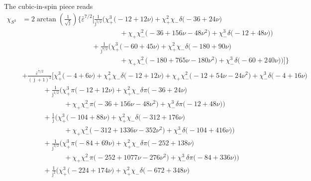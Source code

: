 \documentclass[prd,superscriptaddress,preprintnumbers,tightenlines,nofootinbib, eqsecnum]{revtex4-2}
\newcommand{\nn}{\nonumber}
\begin{document}
The cubic-in-spin piece reads
\begin{align}
\chi_{S^3} &= 2\arctan\!\left(\frac{1}{\sqrt{\bar{\jmath}}}\right)\Bigg\{\bar{\varepsilon}^{7/2}\Bigg[
\frac{1}{\bar{\jmath}^{5/2}}\Bigg(\chi_{+}^{3}\bigg(-12 + 12 \nu\bigg) + \chi_{+}^{2}\chi_{-}\delta\bigg(-36 + 24 \nu\bigg) \nn \\
&\qquad\qquad\qquad\qquad\qquad\qquad\qquad + \chi_{+}\chi_{-}^{2}\bigg(-36 + 156 \nu - 48 \nu^{2}\bigg) + \chi_{-}^{3}\delta\bigg(-12 + 48 \nu\bigg)\Bigg) \nn \\
&\qquad\qquad\qquad\qquad\qquad + \frac{1}{\bar{\jmath}^{7/2}}\Bigg(\chi_{+}^{3}\bigg(-60 + 45 \nu\bigg) + \chi_{+}^{2}\chi_{-}\delta\bigg(-180 + 90 \nu\bigg)\nn \\
&\qquad\qquad\qquad\qquad\qquad\qquad\qquad + \chi_{+}\chi_{-}^{2}\bigg(-180 + 765 \nu - 180 \nu^{2}\bigg)  + \chi_{-}^{3}\delta\bigg(-60 + 240 \nu\bigg)\Bigg)\Bigg]\Bigg\} \nn \\
&+ \frac{\bar{\varepsilon}^{7/2}}{(\bar{\jmath}+1)^{2}}\Bigg[
\chi_{+}^{3}\bigg(-4 + 6 \nu\bigg) + \chi_{+}^{2}\chi_{-}\delta\bigg(-12 + 12 \nu\bigg) + \chi_{+}\chi_{-}^{2}\bigg(-12 + 54 \nu - 24 \nu^{2}\bigg) + \chi_{-}^{3}\delta\bigg(-4 + 16 \nu\bigg) \nn \\
&\qquad\quad + \frac{1}{\bar{\jmath}^{1/2}}\Bigg(\chi_{+}^{3}\pi\bigg(-12 + 12 \nu\bigg) + \chi_{+}^{2}\chi_{-}\delta\pi\bigg(-36 + 24 \nu\bigg) \nn \\
&\qquad\qquad\qquad + \chi_{+}\chi_{-}^{2}\pi\bigg(-36 + 156 \nu - 48 \nu^{2}\bigg)  + \chi_{-}^{3}\delta\pi\bigg(-12 + 48 \nu\bigg)\Bigg) \nn \\
&\qquad\quad + \frac{1}{\bar{\jmath}}\Bigg(\chi_{+}^{3}\bigg(-104 + 88 \nu\bigg) + \chi_{+}^{2}\chi_{-}\delta\bigg(-312 + 176 \nu\bigg) \nn \\
&\qquad\qquad\qquad  + \chi_{+}\chi_{-}^{2}\bigg(-312 + 1336 \nu - 352 \nu^{2}\bigg)   + \chi_{-}^{3}\delta\bigg(-104 + 416 \nu\bigg)\Bigg) \nn \\
&\qquad\quad + \frac{1}{\bar{\jmath}^{3/2}}\Bigg(\chi_{+}^{3}\pi\bigg(-84 + 69 \nu\bigg) + \chi_{+}^{2}\chi_{-}\delta\pi\bigg(-252 + 138 \nu\bigg) \nn \\
&\qquad\qquad\qquad  + \chi_{+}\chi_{-}^{2}\pi\bigg(-252 + 1077 \nu - 276 \nu^{2}\bigg) + \chi_{-}^{3}\delta\pi\bigg(-84 + 336 \nu\bigg)\Bigg) \nn \\
&\qquad\quad + \frac{1}{\bar{\jmath}^{2}}\Bigg(\chi_{+}^{3}\bigg(-224 + 174 \nu\bigg) + \chi_{+}^{2}\chi_{-}\delta\bigg(-672 + 348 \nu\bigg) \nn \\

\end{align}
\end{document}
